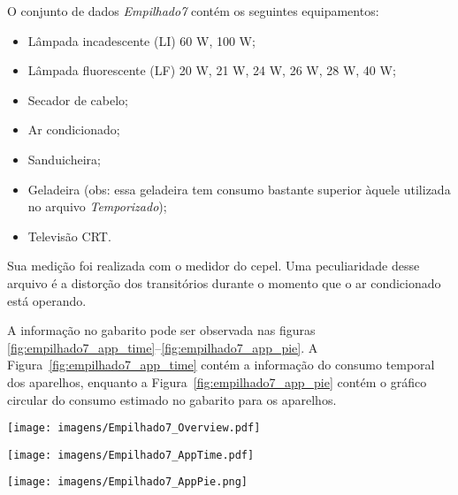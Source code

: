 O conjunto de dados \emph{Empilhado7} contém os seguintes
equipamentos:

\begin{itemize}
\item Lâmpada incadescente (LI) 60 W, 100 W;
\item Lâmpada fluorescente (LF) 20 W, 21 W, 24 W, 26 W, 28 W, 40 W;
\item Secador de cabelo;
\item Ar condicionado;
\item Sanduicheira;
\item Geladeira (obs: essa geladeira tem consumo bastante superior
àquele utilizada no arquivo \emph{Temporizado});
\item Televisão CRT.
\end{itemize}

Sua medição foi realizada com o medidor do \acs{cepel}. Uma
peculiaridade desse arquivo é a distorção dos transitórios durante o
momento que o ar condicionado está operando.

A informação no gabarito pode ser observada nas figuras
\ref{fig:empilhado7_app_time}--\ref{fig:empilhado7_app_pie}. 
A Figura~\ref{fig:empilhado7_app_time} contém a informação do consumo
temporal dos aparelhos, enquanto a Figura~\ref{fig:empilhado7_app_pie}
contém o gráfico circular do consumo estimado no gabarito para os
aparelhos.


\begin{sidewaysfigure}[p]
\centering
\texttt{[image: imagens/Empilhado7\_Overview.pdf]}
\caption{Perfil de consumo para o conjunto de dados \emph{Empilhado7}.}
\label{fig:empilhado7_overview}
\end{sidewaysfigure}

\begin{sidewaysfigure}[p]
\centering
\texttt{[image: imagens/Empilhado7\_AppTime.pdf]}
\caption{Informação no gabarito para o conjunto de dados
\emph{Empilhado7}: consumo temporal dos aparelhos.}
\label{fig:empilhado7_app_time}
\end{sidewaysfigure}

\begin{sidewaysfigure}[p]
\centering
\texttt{[image: imagens/Empilhado7\_AppPie.png]}
\caption{Informação no gabarito para o conjunto de dados
\emph{Empilhado7}: gráfico circular do consumo dos aparelhos.}
\label{fig:empilhado7_app_pie}
\end{sidewaysfigure}

\FloatBarrier









